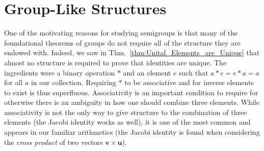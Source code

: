 \section{Group-Like Structures}
    One of the motivating reasons for studying semigroups is that many of the
    foundational theorems of groups do not require all of the structure they are
    endowed with. Indeed, we saw in Thm.~\ref{thm:Unital_Elements_are_Unique}
    that almost no structure is required to prove that identities are unique.
    The ingredients were a binary operation $*$ and an element $e$ such that
    $a*e=e*a=a$ for all $a$ in our collection. Requiring $*$ to be associative
    and for inverse elements to exist is thus superfluous. Associativity is an
    important condition to require for otherwise there is an ambiguity in how
    one should combine three elements. While associativity is not the only way
    to give structure to the combination of three elements (the Jacobi identity
    works as well), it is one of the most common and
    appears in our familiar arithmetics (the Jacobi identity is found when
    considering the \textit{cross product} of two vectors
    $\mathbf{v}\times\mathbf{u}$).
